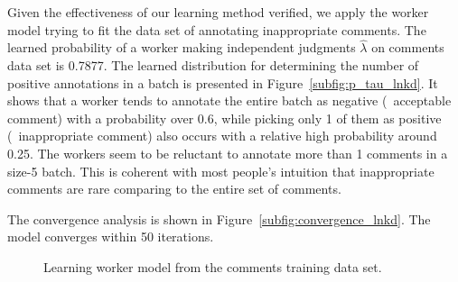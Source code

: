 Given the effectiveness of our learning method verified, 
we apply the worker model trying to fit the data set of annotating inappropriate comments.  
The learned probability of a worker making independent judgments $\hat{\lambda}$ on comments data set is 0.7877.  
The learned distribution for determining the number of positive annotations in a batch is presented in Figure~\ref{subfig:p_tau_lnkd}.  
It shows that a worker tends to annotate the entire batch as negative (\ie~acceptable comment) with a probability over 0.6, 
while picking only 1 of them as positive (\ie~inappropriate comment) also occurs with a relative high probability around 0.25.  
The workers seem to be reluctant to annotate more than 1 comments in a size-5 batch.  
This is coherent with most people's intuition that inappropriate comments are rare comparing to the entire set of comments.  

The convergence analysis is shown in Figure~\ref{subfig:convergence_lnkd}.  
The model converges within 50 iterations.  


\begin{figure}[!t]
  \centering
  \caption{\label{fig:lnkd_training}
  Learning worker model from the comments training data set.
  }
  \vspace{-0.2in}
\end{figure}


